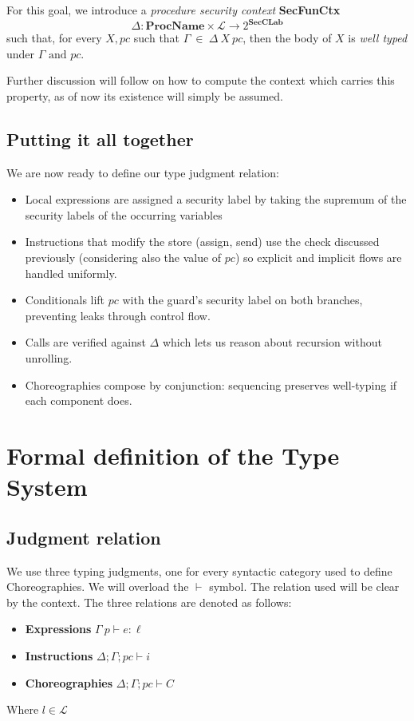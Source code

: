 \documentclass[12pt,a4paper,twoside]{book}
\newcommand{\MCL}{\mathscr{L}}
\begin{document}
For this goal, we introduce a \textit{procedure security context} \textbf{SecFunCtx}
$$\Delta: \textbf{ProcName} \times \MCL \rightarrow 2^\textbf{SecCLab}$$
such that, for every $X, pc$ such that $\Gamma ~ \in ~ \Delta ~ X ~ pc$, then the body of $X$ is \textit{well typed} under $\Gamma \text{ and } pc$.

Further discussion will follow on how to compute the context which carries this property, as of now its existence will simply be assumed.

\subsection{Putting it all together}
We are now ready to define our type judgment relation:
\begin{itemize}
  \item Local expressions are assigned a security label by taking the supremum of the security labels of the occurring variables
  \item Instructions that modify the store (assign, send) use the check discussed previously (considering also the value of $pc$) so explicit and implicit flows are handled uniformly.
  \item Conditionals lift $pc$ with the guard's security label on both branches, preventing leaks through control flow.
  \item Calls are verified against $\Delta$ which lets us reason about recursion without unrolling.
  \item Choreographies compose by conjunction: sequencing preserves well-typing if each component does.
\end{itemize}

\section{Formal definition of the Type System}
\label{type:formal}

\subsection{Judgment relation}
We use three typing judgments, one for every syntactic category used to define Choreographies. We will overload the $\vdash$ symbol. The relation used will be clear by the context. The three relations are denoted as follows:
\begin{itemize}
	\item{\textbf{Expressions}} \(\Gamma~p \vdash e : \ell\)
	\item{\textbf{Instructions}} \(\Delta;\Gamma;pc \vdash i\)
	\item{\textbf{Choreographies}} \(\Delta;\Gamma;pc \vdash C\)
\end{itemize}
Where $l \in \MCL$ 
\end{document}
